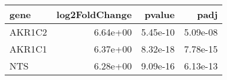 \begin{tabular}{lrrr}
\toprule
  gene &  log2FoldChange &   pvalue &     padj \\
\midrule
AKR1C2 &        6.64e+00 & 5.45e-10 & 5.09e-08 \\
AKR1C1 &        6.37e+00 & 8.32e-18 & 7.78e-15 \\
   NTS &        6.28e+00 & 9.09e-16 & 6.13e-13 \\
\bottomrule
\end{tabular}
